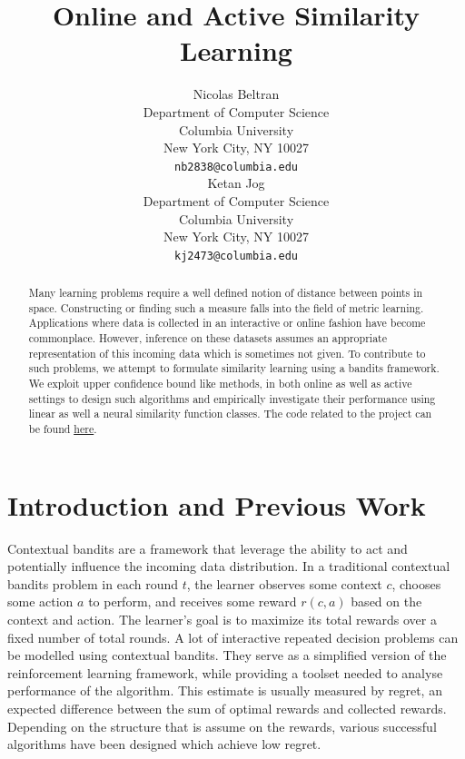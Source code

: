 \documentclass{article}
\title{Online and Active Similarity Learning}
\author{
  Nicolas Beltran\\
  Department of Computer Science\\
  Columbia University\\
  New York City, NY 10027 \\
  \texttt{nb2838@columbia.edu}\\
  \And
  Ketan Jog\\
  Department of Computer Science\\
  Columbia University\\
  New York City, NY 10027 \\
  \texttt{kj2473@columbia.edu}\\
}
\newcommand{\myul}[2][black]{\setulcolor{#1}\ul{#2}\setulcolor{black}}
\begin{document}
\maketitle

\begin{abstract}
    Many learning problems require a well defined notion of distance between points in space.
    Constructing or finding such a measure falls into the field of metric learning.
    Applications where data is collected in an interactive or online fashion have become commonplace.
    However, inference on these datasets assumes an appropriate representation of this incoming data which is sometimes not given.
    To contribute to such problems, we attempt to formulate similarity learning using a bandits framework.
    We exploit upper confidence bound like methods, in both online as well as active settings to design such algorithms
    and empirically investigate their performance using linear as well a neural similarity function classes.
    The code related to the project can be found \href{https://github.com/velezbeltran/metric-bandits}{\color{blue} \myul[blue] here}.
\end{abstract}


\section{Introduction and Previous Work}
Contextual bandits are a framework that leverage the ability to act and potentially influence the incoming data distribution.
In a traditional contextual bandits problem in each round $t$, the learner observes some context $c$, chooses some action $a$ to perform, and receives some reward $r(c,a)$ based on the context and action.
The learner's goal is to maximize its total rewards over a fixed number of total rounds.
A lot of interactive repeated decision problems can be modelled using contextual bandits.
They serve as a simplified version of the reinforcement learning framework, while providing a toolset needed to analyse performance of the algorithm.
This estimate is usually measured by regret, an expected difference between the sum of optimal rewards and collected rewards.
Depending on the structure that is assume on the rewards, various successful algorithms have been designed which achieve low regret.\cite{bandit-algorithms}
\end{document}
